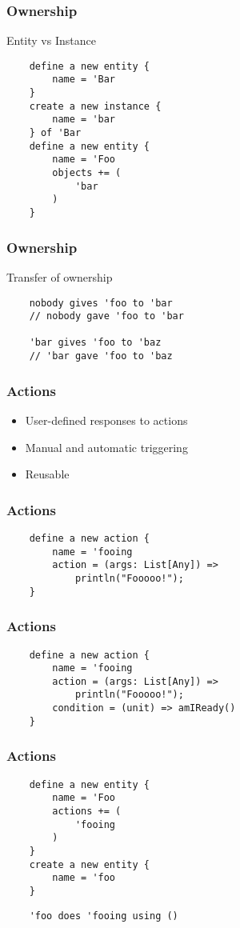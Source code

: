 \documentclass{beamer}
\begin{document}
\begin{frame}[fragile]
    \frametitle{Ownership}
    Entity vs Instance
    \begin{lstlisting}
    define a new entity {
        name = 'Bar
    }
    create a new instance {
        name = 'bar
    } of 'Bar
    define a new entity {
        name = 'Foo
        objects += (
            'bar
        )
    }
    \end{lstlisting}
\end{frame}

\begin{frame}[fragile]
    \frametitle{Ownership}
    Transfer of ownership
    \begin{lstlisting}
    nobody gives 'foo to 'bar
    // nobody gave 'foo to 'bar

    'bar gives 'foo to 'baz
    // 'bar gave 'foo to 'baz
    \end{lstlisting}
\end{frame}

\begin{frame}
    \frametitle{Actions}
    \begin{itemize}[<+->]
        \item{User-defined responses to actions}
        \item{Manual and automatic triggering}
        \item{Reusable}
    \end{itemize}
\end{frame}

\begin{frame}[fragile]
    \frametitle{Actions}
    \begin{lstlisting}
    define a new action {
        name = 'fooing
        action = (args: List[Any]) =>
            println("Fooooo!");
    }
    \end{lstlisting}
\end{frame}

\begin{frame}[fragile]
    \frametitle{Actions}
    \begin{lstlisting}
    define a new action {
        name = 'fooing
        action = (args: List[Any]) =>
            println("Fooooo!");
        condition = (unit) => amIReady()
    }
    \end{lstlisting}
\end{frame}

\begin{frame}[fragile]
    \frametitle{Actions}
    \begin{lstlisting}
    define a new entity {
        name = 'Foo
        actions += (
            'fooing
        )
    }
    create a new entity {
        name = 'foo
    }
    \end{lstlisting}
    \pause
    \begin{lstlisting}
    'foo does 'fooing using ()
    \end{lstlisting}
\end{frame}
\end{document}
